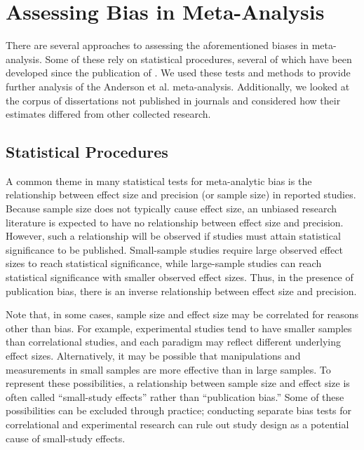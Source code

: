 \documentclass[man, mask]{apa6}
\begin{document}
\section{Assessing Bias in Meta-Analysis}
There are several approaches to assessing the aforementioned biases in meta-analysis. Some of these rely on statistical procedures, several of which have been developed since the publication of \citet{Anderson:etal:2010}. We used these tests and methods to provide further analysis of the Anderson et al. meta-analysis. Additionally, we looked at the corpus of dissertations not published in journals and considered how their estimates differed from other collected research.

\subsection{Statistical Procedures}
A common theme in many statistical tests for meta-analytic bias is the relationship between effect size and precision (or sample size) in reported studies. Because sample size does not typically cause effect size, an unbiased research literature is expected to have no relationship between effect size and precision. However, such a relationship will be observed if studies must attain statistical significance to be published. Small-sample studies require large observed effect sizes to reach statistical significance, while large-sample studies can reach statistical significance with smaller observed effect sizes. Thus, in the presence of publication bias, there is an inverse relationship between effect size and precision. 

Note that, in some cases, sample size and effect size may be correlated for reasons other than bias. For example, experimental studies tend to have smaller samples than correlational studies, and each paradigm may reflect different underlying effect sizes. Alternatively, it may be possible that manipulations and measurements in small samples are more effective than in large samples. To represent these possibilities, a relationship between sample size and effect size is often called ``small-study effects'' rather than ``publication bias.'' Some of these possibilities can be excluded through practice; conducting separate bias tests for correlational and experimental research can rule out study design as a potential cause of small-study effects.
\end{document}
